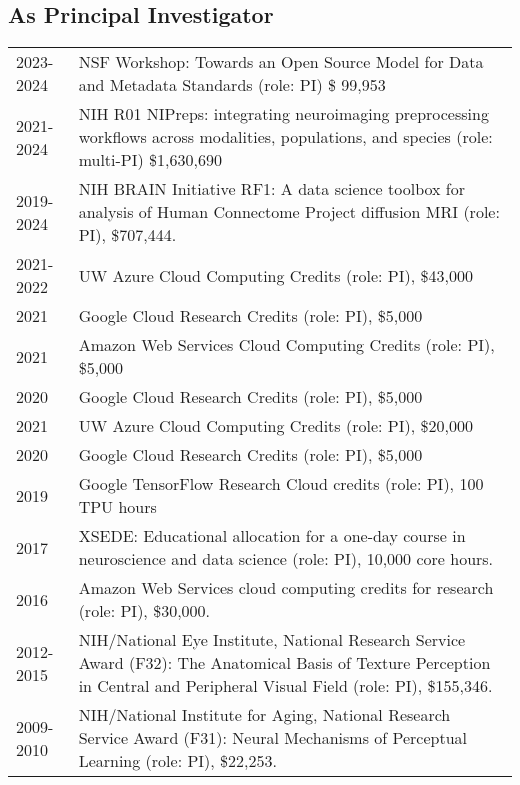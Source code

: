 \documentclass[11pt,fullpage]{article}
\begin{document}
\subsection*{As Principal Investigator}
\begin{tabular}{p{}p{}}

2023-2024 & NSF Workshop: Towards an Open Source Model for Data and Metadata Standards (role: PI) \$ 99,953\\
2021-2024 & NIH R01 NIPreps: integrating neuroimaging preprocessing workflows across modalities, populations, and species (role: multi-PI) \$1,630,690 \\
2019-2024 & NIH BRAIN Initiative RF1: A data science toolbox for analysis of Human Connectome Project diffusion MRI (role: PI), \$707,444.\\
2021-2022 & UW Azure Cloud Computing Credits (role: PI), \$43,000\\
2021 & Google Cloud Research Credits (role: PI), \$5,000\\
2021 & Amazon Web Services Cloud Computing Credits (role: PI), \$5,000 \\
2020 & Google Cloud Research Credits (role: PI), \$5,000\\
2021 & UW Azure Cloud Computing Credits (role: PI), \$20,000\\
2020 & Google Cloud Research Credits (role: PI), \$5,000\\
2019 & Google TensorFlow Research Cloud credits (role: PI), 100 TPU hours \\
2017 & XSEDE: Educational allocation for a one-day course in neuroscience and data science (role: PI), 10,000 core hours. \\
2016 & Amazon Web Services cloud computing credits for research (role: PI), \$30,000. \\
2012-2015 & NIH/National Eye Institute, National Research Service Award (F32): The Anatomical Basis of Texture Perception in Central and Peripheral Visual Field (role: PI),  \$155,346. \\
2009-2010 & NIH/National Institute for Aging, National Research Service Award (F31): Neural Mechanisms of Perceptual Learning (role: PI), \$22,253. \\
\end{tabular}
\end{document}
